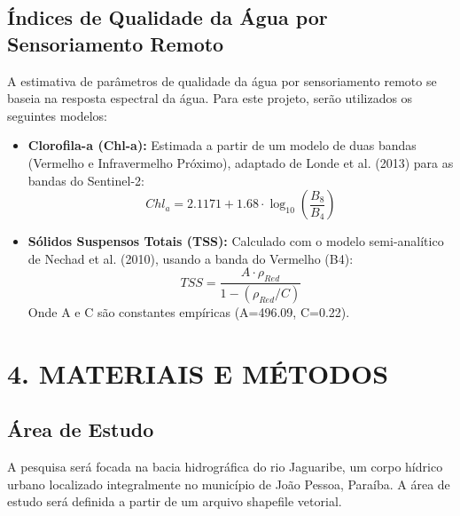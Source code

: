 \documentclass[12pt, a4paper]{article}
\begin{document}
    \subsection{Índices de Qualidade da Água por Sensoriamento Remoto}
    A estimativa de parâmetros de qualidade da água por sensoriamento remoto se baseia na resposta espectral da água. Para este projeto, serão utilizados os seguintes modelos:
    \begin{itemize}
        \item \textbf{Clorofila-a (Chl-a):} Estimada a partir de um modelo de duas bandas (Vermelho e Infravermelho Próximo), adaptado de Londe et al. (2013) para as bandas do Sentinel-2:
        $$ Chl_a = 2.1171 + 1.68 \cdot \log_{10}\left(\frac{B_{8}}{B_{4}}\right) $$
        \item \textbf{Sólidos Suspensos Totais (TSS):} Calculado com o modelo semi-analítico de Nechad et al. (2010), usando a banda do Vermelho (B4):
        $$ TSS = \frac{A \cdot \rho_{Red}}{1 - (\rho_{Red} / C)} $$
        Onde A e C são constantes empíricas (A=496.09, C=0.22).
    \end{itemize}

    \section*{4. MATERIAIS E MÉTODOS}
    \subsection{Área de Estudo}
    A pesquisa será focada na bacia hidrográfica do rio Jaguaribe, um corpo hídrico urbano localizado integralmente no município de João Pessoa, Paraíba. A área de estudo será definida a partir de um arquivo shapefile vetorial.
\end{document}
